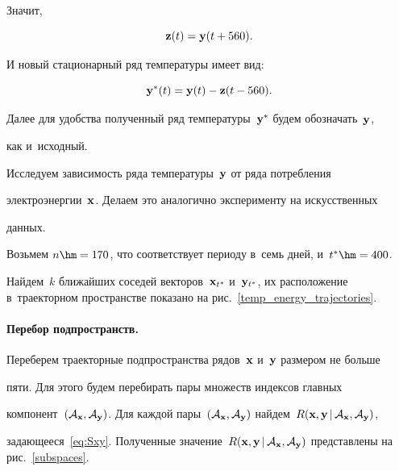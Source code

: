 Значит,

$$

\bz(t) = \by(t + 560).

$$

И новый стационарный ряд температуры имеет вид:

$$

\by^*(t) = \by(t) - \bz(t -  560).

$$

Далее для удобства полученный ряд температуры~$\mathbf{y}^*$ будем обозначать~$\mathbf{y}$, 

как и~исходный.



Исследуем зависимость ряда температуры~$\mathbf{y}$ от ряда потребления 

электроэнергии~$\mathbf{x}$. Делаем это аналогично эксперименту на искусственных 

данных.

Возьмем $n\hm = 170$, что соответствует периоду в~семь дней, и~$t^* \hm= 400$.

\mbox{Найдем}~$k$ ближайших соседей векторов~$\mathbf{x}_{t^*}$ и~$\mathbf{y}_{t^*}$, их расположение в~траекторном пространстве показано на рис.~\ref{temp_energy_trajectories}.



\vspace*{-6pt}



\paragraph*{Перебор подпространств.}

Переберем траекторные подпространства рядов~$\mathbf{x}$ и~$\mathbf{y}$ размером не больше 

пяти. Для этого будем перебирать пары множеств индексов главных 

компонент~$\left(\cA_{\bx}, \cA_{\by}\right)$. Для каждой пары~$\left(\cA_{\bx}, 

\cA_{\by}\right)$ найдем~$R(\bx, \by\,|\, \cA_{\bx}, \cA_{\by})$, 

задающееся~\eqref{eq:Sxy}. Полученные значение~$R(\bx, \by\,|\, \cA_{\bx}, 

\cA_{\by})$ представлены на рис.~\ref{subspaces}.



